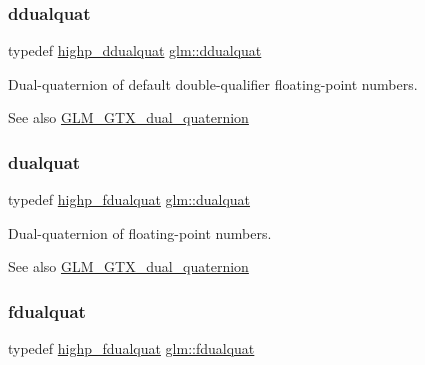\subsubsection{\texorpdfstring{ddualquat}{ddualquat}}
{\footnotesize\ttfamily typedef \hyperlink{group__gtx__dual__quaternion_ga83e4c5d27c8b0a264a3f3aed24f3f84e}{highp\+\_\+ddualquat} \hyperlink{group__gtx__dual__quaternion_ga373431ffdd82d5c03c258217a9e1f1a6}{glm\+::ddualquat}}

Dual-\/quaternion of default double-\/qualifier floating-\/point numbers.

\begin{DoxySeeAlso}{See also}
\hyperlink{group__gtx__dual__quaternion}{G\+L\+M\+\_\+\+G\+T\+X\+\_\+dual\+\_\+quaternion} 
\end{DoxySeeAlso}
\mbox{\label{group__gtx__dual__quaternion_ga2f6227b5f9dc08a2e7682065a84b3aa9}} 
\subsubsection{\texorpdfstring{dualquat}{dualquat}}
{\footnotesize\ttfamily typedef \hyperlink{group__gtx__dual__quaternion_ga8c46d61c38b2b6d9c5091c667dd20fe8}{highp\+\_\+fdualquat} \hyperlink{group__gtx__dual__quaternion_ga2f6227b5f9dc08a2e7682065a84b3aa9}{glm\+::dualquat}}

Dual-\/quaternion of floating-\/point numbers.

\begin{DoxySeeAlso}{See also}
\hyperlink{group__gtx__dual__quaternion}{G\+L\+M\+\_\+\+G\+T\+X\+\_\+dual\+\_\+quaternion} 
\end{DoxySeeAlso}
\mbox{\label{group__gtx__dual__quaternion_ga436906129bc69ca5059555cafcbac9fd}} 
\subsubsection{\texorpdfstring{fdualquat}{fdualquat}}
{\footnotesize\ttfamily typedef \hyperlink{group__gtx__dual__quaternion_ga8c46d61c38b2b6d9c5091c667dd20fe8}{highp\+\_\+fdualquat} \hyperlink{group__gtx__dual__quaternion_ga436906129bc69ca5059555cafcbac9fd}{glm\+::fdualquat}}

